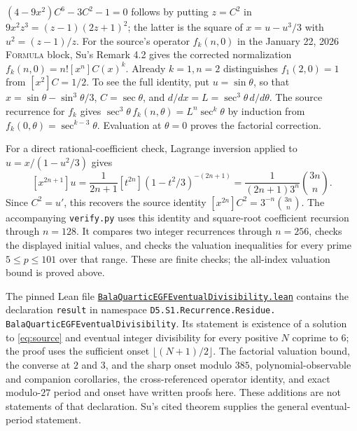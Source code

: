 \documentclass[11pt]{article}
\newcommand{\coeff}[2]{[#1]#2}
\begin{document}
$(4-9x^2)C^6-3C^2-1=0$ follows by putting $z=C^2$ in
$9x^2z^3=(z-1)(2z+1)^2$; the latter is the square of
$x=u-u^3/3$ with $u^2=(z-1)/z$.
For the source's operator $f_k(n,0)$ in the January 22, 2026
\textsc{Formula} block, Su's Remark 4.2 gives the corrected normalization
$f_k(n,0)=n!\coeff{x^n}{C(x)^k}$. Already $k=1,n=2$ distinguishes
$f_1(2,0)=1$ from $\coeff{x^2}{C}=1/2$.
To see the full identity, put $u=\sin\theta$, so that
$x=\sin\theta-\sin^3\theta/3$, $C=\sec\theta$, and
$d/dx=L=\sec^3\theta\,d/d\theta$.
The source recurrence for $f_k$ gives
$\sec^3\theta\,f_k(n,\theta)=L^n\sec^k\theta$ by induction from
$f_k(0,\theta)=\sec^{k-3}\theta$.
Evaluation at $\theta=0$ proves the factorial correction.

For a direct rational-coefficient check, Lagrange inversion
\cite[Theorem 2.1.1, equation (2.1.1)]{gessel} applied to
$u=x/(1-u^2/3)$ gives
\[
\coeff{x^{2n+1}}{u}
=\frac1{2n+1}\coeff{t^{2n}}{(1-t^2/3)^{-(2n+1)}}
=\frac1{(2n+1)3^n}\binom{3n}{n}.
\]
Since $C^2=u'$, this recovers the source identity
$\coeff{x^{2n}}{C^2}=3^{-n}\binom{3n}{n}$.
The accompanying \texttt{verify.py} uses this identity and square-root
coefficient recursion through $n=128$. It compares two integer recurrences
through $n=256$, checks the displayed initial values, and checks
the valuation inequalities for every prime $5\leq p\leq101$ over that range.
These are finite checks; the all-index valuation bound is proved above.

The pinned Lean file
\href{https://github.com/the-omega-institute/trureturing/blob/b0f7c01b01511ea00428c1b6edad5dd2b372eaf8/D5/S1/Recurrence/Residue/BalaQuarticEGFEventualDivisibility.lean}{\texttt{BalaQuarticEGFEventualDivisibility.lean}}
contains the declaration \texttt{result} in namespace
\texttt{D5.S1.Recurrence.Residue.}\allowbreak
\texttt{BalaQuarticEGFEventualDivisibility}.
Its statement is existence of a solution to \eqref{eq:source} and eventual
integer divisibility for every positive $N$ coprime to $6$;
the proof uses the sufficient onset $\lfloor(N+1)/2\rfloor$.
The factorial valuation bound, the converse at $2$ and $3$, and the sharp
onset modulo $385$, polynomial-observable and companion corollaries,
the cross-referenced operator identity, and exact modulo-$27$ period and
onset have written proofs here.
These additions are not statements of that declaration.
Su's cited theorem supplies
the general eventual-period statement.
\end{document}
